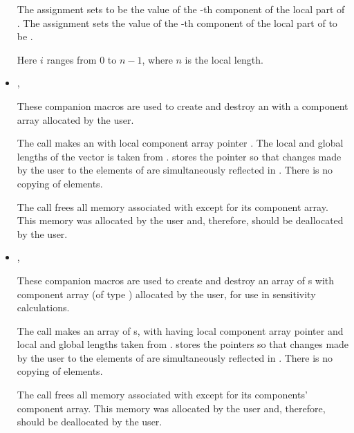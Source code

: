 \begin{itemize}
      The assignment  sets  to be the value of 
      the -th component of the local part of . 
      The assignment    
      sets the value of the -th component of the local part of  
      to be .        

      Here $i$ ranges from $0$ to $n-1$, where $n$ is the local length.

\item {}, 

      These companion macros are used to create and          
      destroy an  with a component array         
      allocated by the user.                                   
                                                               
      The call  makes  an        
       with local component array pointer . 
      The local and global lengths of the  
      vector  is taken from .                             
       stores the pointer  so that changes      
      made by the user to the elements of  are           
      simultaneously reflected in . There is no copying of    
      elements.                                                
                                                               
      The call  frees all memory associated     
      with  except for its component array. This memory was   
      allocated by the user and, therefore, should be          
      deallocated by the user.   

\item {}, 
                             
      These companion macros are used to create and destroy  
      an array of s with component array  
      (of type ) allocated by the user, for use
      in sensitivity calculations.
                                                               
      The call  makes   
       an array of  s, with  having
      local component array pointer  and local and global lengths taken 
      from .    
       stores the pointers  so that        
      changes made by the user to the elements of  are  
      simultaneously reflected in . There is no copying of   
      elements.                                                
                                                               
      The call  frees all memory associated   
      with  except for its components' component array.      
      This memory was allocated by the user and, therefore,    
      should be deallocated by the user.                       

\end{itemize}

